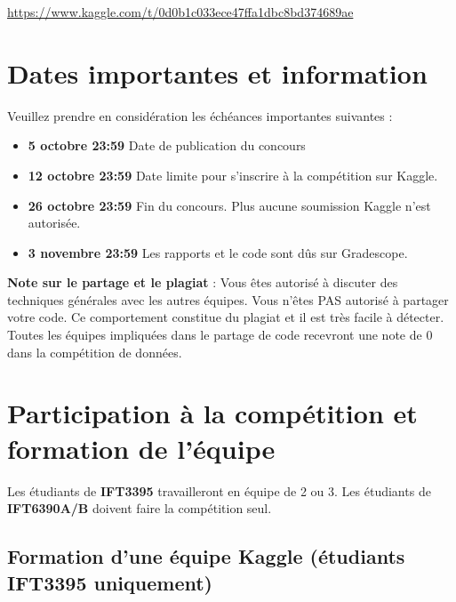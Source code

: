 \documentclass[12pt]{article}
\begin{document}
\begin{center}
\href{https://www.kaggle.com/t/0d0b1c033ece47ffa1dbc8bd374689ae}{https://www.kaggle.com/t/0d0b1c033ece47ffa1dbc8bd374689ae}
\end{center}

\section{Dates importantes et information}
\label{sec:dates}

Veuillez prendre en considération les échéances importantes suivantes :
 
\begin{itemize}
   \item \textbf{5 octobre 23\!:59} Date de publication du concours
  \item \textbf{12 octobre 23\!:59} Date limite pour s'inscrire à la compétition sur Kaggle.
  \item \textbf{26 octobre 23\!:59} Fin du concours. Plus aucune soumission Kaggle n'est autorisée.
  \item \textbf{3 novembre 23\!:59} Les rapports et le code sont dûs sur Gradescope.
\end{itemize} 
 
\textbf{Note sur le partage et le plagiat} :
Vous êtes autorisé à discuter des techniques générales avec les autres équipes. Vous n'êtes PAS autorisé à partager votre code. Ce comportement constitue du plagiat et il est très facile à détecter. Toutes les équipes impliquées dans le partage de code recevront une note de 0 dans la compétition de données.

\section{Participation à la compétition et formation de l'équipe} 

Les étudiants de \textbf{IFT3395} travailleront en équipe de 2 ou 3. Les étudiants de \textbf{IFT6390A/B} doivent faire la compétition seul. 

\subsection{Formation d'une équipe Kaggle (étudiants IFT3395 uniquement)}
\end{document}

